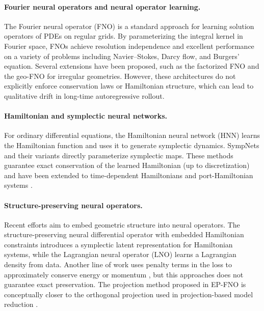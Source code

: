 \documentclass[11pt,a4paper]{article}
\theoremstyle{definition}
\theoremstyle{remark}
\numberwithin{equation}{section}
\numberwithin{figure}{section}
\numberwithin{table}{section}
\begin{document}
\paragraph{Fourier neural operators and neural operator learning.}
The Fourier neural operator (FNO) \cite{li2020fourier,kovachki2023neural} is a standard approach for learning solution operators of PDEs on regular grids. By parameterizing the integral kernel in Fourier space, FNOs achieve resolution independence and excellent performance on a variety of problems including Navier--Stokes, Darcy flow, and Burgers' equation. Several extensions have been proposed, such as the factorized FNO \cite{tran2021factorized} and the geo-FNO \cite{li2023fourier} for irregular geometries. However, these architectures do not explicitly enforce conservation laws or Hamiltonian structure, which can lead to qualitative drift in long-time autoregressive rollout.

\paragraph{Hamiltonian and symplectic neural networks.}
For ordinary differential equations, the Hamiltonian neural network (HNN) \cite{greydanus2019hamiltonian} learns the Hamiltonian function and uses it to generate symplectic dynamics. SympNets \cite{jin2020sympnets} and their variants \cite{burby2021normal} directly parameterize symplectic maps. These methods guarantee exact conservation of the learned Hamiltonian (up to discretization) and have been extended to time-dependent Hamiltonians \cite{zhong2024symp} and port-Hamiltonian systems \cite{dipersio2025porthamiltonian}. 


\paragraph{Structure-preserving neural operators.}
Recent efforts aim to embed geometric structure into neural operators. The structure-preserving neural differential operator with embedded Hamiltonian constraints \cite{najera2023structure} introduces a symplectic latent representation for Hamiltonian systems, while the Lagrangian neural operator (LNO) \cite{cranmer2020lagrangian} learns a Lagrangian density from data. Another line of work uses penalty terms in the loss to approximately conserve energy or momentum \cite{kissas2020machine}, but this approaches does not guarantee exact preservation. The projection method proposed in EP-FNO is conceptually closer to the orthogonal projection used in projection-based model reduction \cite{carlberg2013gnat}. %
\end{document}
